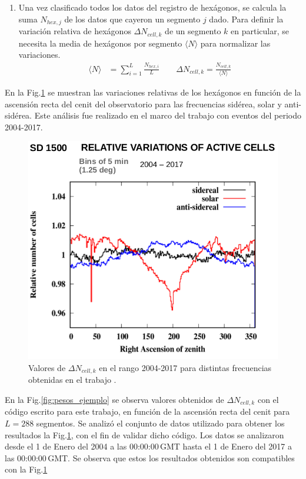 \begin{enumerate}
        \item Una vez clasificado todos los datos del registro de hexágonos, se calcula la suma  $N_{hex, j}$ de los datos que cayeron un segmento $j$ dado. Para definir la variación relativa de hexágonos  $\Delta N_{cell,k}$ de un segmento $k$ en particular, se necesita la media de hexágonos por segmento $ \langle N \rangle$  para normalizar las variaciones.
       \begin{align}
         \langle N \rangle &= \sum^{L}_{i=1} \frac{N_{hex, i}}{L}  \qquad
         \Delta N_{cell,k} = \frac{N_{cell, k}}{\langle N \rangle}  \label{epepe}
       \end{align}

      \end{enumerate}

      En la Fig.\ref{fig:pesos_referencia} se muestran las variaciones relativas de los hexágonos en función de la ascensión recta del cenit del observatorio para las frecuencias sidérea, solar y anti-sidérea. Este análisis fue realizado en el marco del trabajo \cite{referencia_pesos} con eventos del periodo 2004-2017. 

          \begin{figure}[H]
          \centering
              \includegraphics[width=0.5\linewidth]{pesos_referencia.png}  
              \caption{Valores de $\Delta N_{cell, k}$ en el rango 2004-2017 para distintas frecuencias obtenidas en el trabajo \cite{referencia_pesos}.}
              \label{fig:pesos_referencia}
        \end{figure}

       En la Fig.\ref{fig:pesos_ejemplo} se observa valores obtenidos de $\Delta N_{cell,k}$  con el código escrito para este trabajo, en función de la ascensión recta del cenit  para $L=288$ segmentos. Se analizó el conjunto de datos  utilizado para obtener los resultados la Fig.\ref{fig:pesos_referencia}, con el fin de validar dicho código. Los datos se analizaron desde el 1 de Enero del 2004 a las 00:00:00\,GMT  hasta el 1 de Enero del 2017 a las 00:00:00\,GMT. Se  observa que estos los resultados obtenidos son compatibles con la Fig.\ref{fig:pesos_referencia}
      

